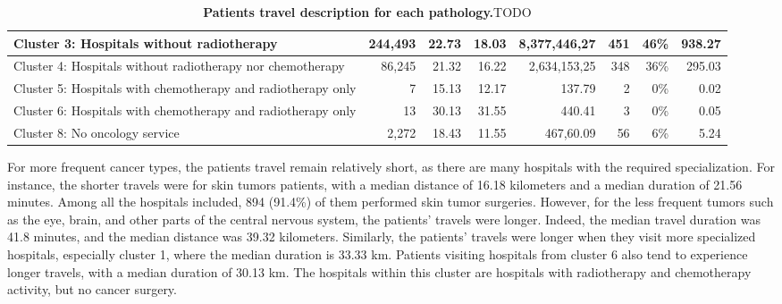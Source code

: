 \begin{table}[h]
{\begin{tabular}{|l|r|r|r|r|r|r|r|}
            Cluster 3: Hospitals without radiotherapy                                        & 244,493          & 22.73                    & 18.03                    & 8,377,446,27            & 451                  & 46\%                  & 938.27                      \\ \hline
            Cluster 4: Hospitals without radiotherapy nor chemotherapy                       & 86,245           & 21.32                    & 16.22                    & 2,634,153,25            & 348                  & 36\%                  & 295.03                      \\ \hline
            Cluster 5: Hospitals with chemotherapy and radiotherapy only                     & 7                & 15.13                    & 12.17                    & 137.79                  & 2                    & 0\%                   & 0.02                        \\ \hline
            Cluster 6: Hospitals with chemotherapy and radiotherapy only                     & 13               & 30.13                    & 31.55                    & 440.41                  & 3                    & 0\%                   & 0.05                        \\ \hline
            Cluster 8: No oncology service                                                   & 2,272            & 18.43                    & 11.55                    & 467,60.09               & 56                   & 6\%                   & 5.24                        \\ \hline
        \end{tabular}
    } \caption{ \textbf{Patients travel description for each pathology.}TODO}
    \label{table:distance_and_co2}
\end{table}

For more frequent cancer types, the patients travel remain relatively short, as
there are many hospitals with the required specialization. For instance, the
shorter travels were for skin tumors patients, with a median distance of 16.18
kilometers and a median duration of 21.56 minutes. Among all the hospitals
included, 894 (91.4\%) of them performed skin tumor surgeries. However, for the
less frequent tumors such as the eye, brain, and other parts of the central
nervous system, the patients' travels were longer. Indeed, the median travel
duration was 41.8 minutes, and the median distance was 39.32 kilometers.
Similarly, the patients' travels were longer when they visit more specialized
hospitals, especially cluster 1, where the median duration is 33.33 km. Patients
visiting hospitals from cluster 6 also tend to experience longer travels, with a
median duration of 30.13 km. The hospitals within this cluster are hospitals
with radiotherapy and chemotherapy activity, but no cancer surgery.

